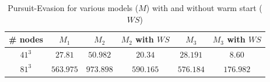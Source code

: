 \begin{table}
\centering
\caption{Pursuit-Evasion for various models ($M$) with and without warm start ($WS$)}
\label{tab:pursuit_evasion}
\begin{tabular}{|c| c| c| c| c|c|}
\hline
\# nodes & $M_1$ & $M_2$ & $M_2$ with $WS$ & $M_3$ & $M_3$ with $WS$\\ \hline
$41^3$ & $27.81$ & $50.982$ & $20.34$ & $28.191$ & $8.60$ \\ \hline
$81^3$ & $563.975$ & $973.898$ & $590.165$ & $576.184$ & $176.982$ \\ \hline
\end{tabular}
\end{table}